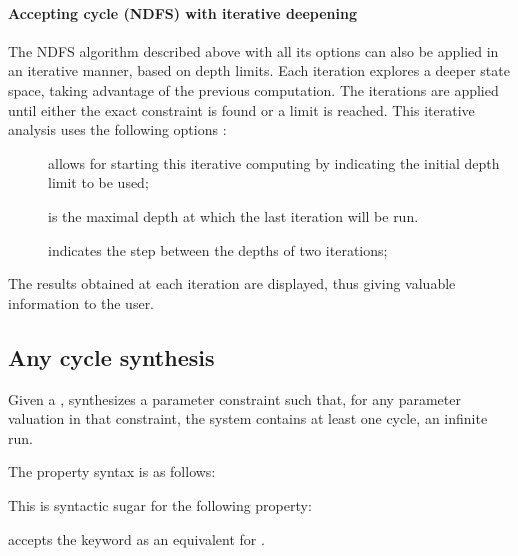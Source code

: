 \paragraph{Accepting cycle (NDFS) with iterative deepening}\label{sss:accepting-loop-NDFS-iterative}

The NDFS algorithm described above with all its options
can also be applied
in an iterative manner, based on depth limits. Each iteration explores a deeper state
space, taking advantage of the previous computation. The iterations are applied until
either the exact constraint is found or a limit is reached. This iterative analysis
uses the following options :

\begin{description}
	\item[] allows for starting this iterative computing by indicating
	      the initial depth limit to be used;
	\item[] is the maximal depth at which the last iteration
	      will be run.
	\item[] indicates the step between the depths of two iterations;
\end{description}

The results obtained at each iteration are displayed, thus giving valuable information
to the user.




\subsection{Any cycle synthesis}\label{ss:loop}


Given a \NIPTA{}, \imitator{} synthesizes a parameter constraint such that, for any parameter valuation in that constraint, the system contains at least one cycle, \ie{} an infinite run. %

The property syntax is as follows:



This is syntactic sugar for the following property:

\begin{syntaxalias}
	\imitator{} accepts the  keyword as an equivalent for .
\end{syntaxalias}



